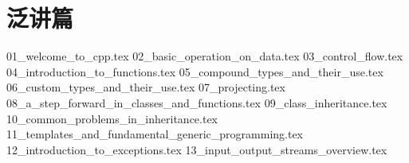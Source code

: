 \part*{泛讲篇}
{01_welcome_to_cpp.tex}
{02_basic_operation_on_data.tex}
{03_control_flow.tex}
{04_introduction_to_functions.tex}
{05_compound_types_and_their_use.tex}
{06_custom_types_and_their_use.tex}
{07_projecting.tex}
{08_a_step_forward_in_classes_and_functions.tex}
{09_class_inheritance.tex}
{10_common_problems_in_inheritance.tex}
{11_templates_and_fundamental_generic_programming.tex}
{12_introduction_to_exceptions.tex}
{13_input_output_streams_overview.tex}